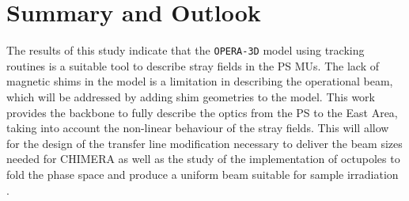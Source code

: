 \documentclass[a4paper,
               biblatex,     %
               keeplastbox,   %
               ]{jacow}
\begin{document}


\section{Summary and Outlook}

The results of this study indicate that the \texttt{OPERA-3D} model using tracking routines is a suitable tool to describe stray fields in the PS MUs. The lack of magnetic shims in the model is a limitation in describing the operational beam, which will be addressed by adding shim geometries to the model. This work provides the backbone to fully describe the optics from the PS to the East Area, taking into account the non-linear behaviour of the stray fields. This will allow for the design of the transfer line modification necessary to deliver the beam sizes needed for CHIMERA as well as the study of the implementation of octupoles to fold the phase space and produce a uniform beam suitable for sample irradiation \cite{tsoupas_uniform_2007-1}.



\printbibliography
\end{document}
